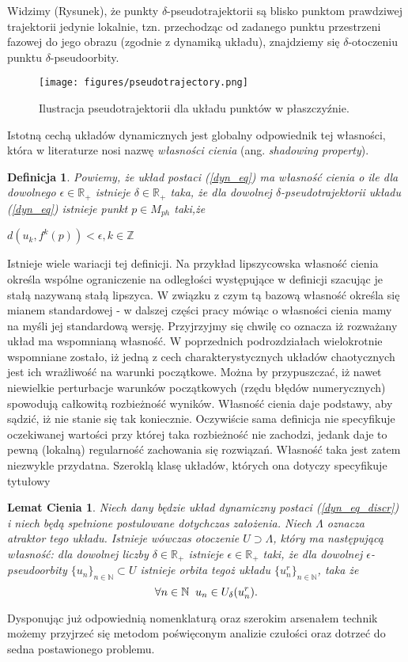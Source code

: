 \documentclass[12pt]{article}
\newtheorem{defi}{Definicja}
\newtheorem{lem}{Lemat Cienia}
\begin{document}
Widzimy (Rysunek), że punkty $\delta$-pseudotrajektorii są blisko punktom prawdziwej trajektorii jedynie lokalnie, tzn. przechodząc od zadanego punktu przestrzeni fazowej do jego obrazu (zgodnie z dynamiką układu), znajdziemy się $\delta$-otoczeniu punktu $\delta$-pseudoorbity. 
\begin{figure}[H]
	\texttt{[image: figures/pseudotrajectory.png]} 
	\centering
	\caption{Ilustracja pseudotrajektorii dla układu punktów w płaszczyźnie.}
\end{figure}
Istotną cechą układów dynamicznych jest globalny odpowiednik tej własności, która w literaturze nosi nazwę \textit{własności cienia} (ang. \textit{shadowing property}).
\begin{defi}\label{shadowing_property}
	Powiemy, że układ postaci (\ref{dyn_eq}) ma własność cienia o ile dla dowolnego $ \epsilon \in \mathbb{R}_{+} $ istnieje $ \delta \in \mathbb{R}_{+} $ taka, że dla dowolnej $\delta$-pseudotrajektorii układu (\ref{dyn_eq}) istnieje punkt $ p \in M_{ph} $ taki,że
	\begin{center}
		$ d(u_{k}, f^{k}(p)) < \epsilon, k \in \mathbb{Z}$
	\end{center}
\end{defi}
Istnieje wiele wariacji tej definicji. Na przykład lipszycowska własność cienia określa wspólne ograniczenie na odległości występujące w definicji szacując je stałą nazywaną stałą lipszyca. W związku z czym tą bazową własność określa się mianem standardowej - w dalszej części pracy mówiąc o własności cienia mamy na myśli jej standardową wersję.\newline
Przyjrzyjmy się chwilę co oznacza iż rozważany układ ma wspomnianą własność. W poprzednich podrozdziałach wielokrotnie wspomniane zostało, iż jedną z cech charakterystycznych układów chaotycznych jest ich wrażliwość na warunki początkowe. Można by przypuszczać, iż nawet niewielkie perturbacje warunków początkowych (rzędu błędów numerycznych) spowodują całkowitą rozbieżność wyników. Własność cienia daje podstawy, aby sądzić, iż nie stanie się tak koniecznie. Oczywiście sama definicja nie specyfikuje oczekiwanej wartości przy której taka rozbieżność nie zachodzi, jedank daje to pewną (lokalną) regularność zachowania się rozwiązań. Własność taka jest zatem niezwykle przydatna. Szeroklą klasę układów, których ona dotyczy specyfikuje tytułowy
\begin{lem}
Niech dany będzie układ dynamiczny postaci (\ref{dyn_eq_discr}) i niech będą spełnione postulowane dotychczas założenia. Niech $\Lambda$ oznacza atraktor tego układu. Istnieje wówczas otoczenie $ U \supset \Lambda $, który ma następującą własność: dla dowolnej liczby $\delta \in \mathbb{R}_{+}$ istnieje $\epsilon \in \mathbb{R}_{+}$  taki, że dla dowolnej $\epsilon$-pseudoorbity $ \{u_{n}\}_{n \in \mathbb{N}} \subset U $ istnieje orbita tegoż układu $ \{u^{r}_{n}\}_{n \in \mathbb{N}} $, taka że
\begin{equation}
\forall{n \in \mathbb{N}} \thickspace \thickspace u_{n} \in U_{\delta}(u^{r}_{n}).
\end{equation}
\end{lem}
Dysponując już odpowiednią nomenklaturą oraz szerokim arsenałem technik możemy przyjrzeć się metodom poświęconym analizie czułości oraz dotrzeć do sedna postawionego problemu. 
\newpage
\end{document}
